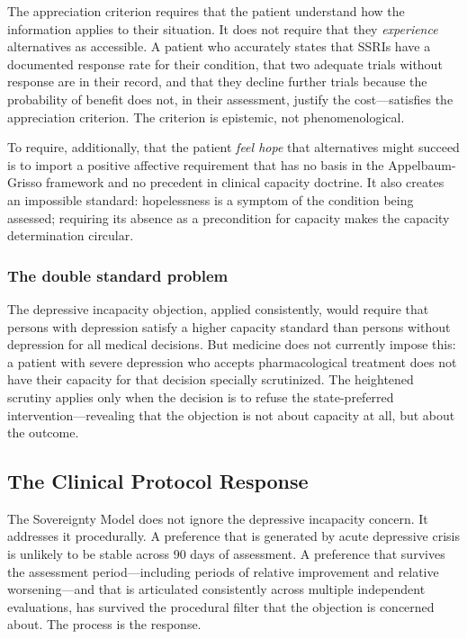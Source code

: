 \documentclass[11pt, letterpaper]{article}
\begin{document}
The appreciation criterion requires that the patient understand how the information
applies to their situation. It does not require that they \textit{experience} alternatives
as accessible. A patient who accurately states that SSRIs have a documented response
rate for their condition, that two adequate trials without response are in their record,
and that they decline further trials because the probability of benefit does not, in
their assessment, justify the cost---satisfies the appreciation criterion. The criterion
is epistemic, not phenomenological.

To require, additionally, that the patient \textit{feel hope} that alternatives might
succeed is to import a positive affective requirement that has no basis in the
Appelbaum-Grisso framework and no precedent in clinical capacity doctrine. It also
creates an impossible standard: hopelessness is a symptom of the condition being
assessed; requiring its absence as a precondition for capacity makes the capacity
determination circular.

\subsubsection{The double standard problem}

The depressive incapacity objection, applied consistently, would require that persons
with depression satisfy a higher capacity standard than persons without depression for
all medical decisions. But medicine does not currently impose this: a patient with
severe depression who accepts pharmacological treatment does not have their capacity
for that decision specially scrutinized. The heightened scrutiny applies only when the
decision is to refuse the state-preferred intervention---revealing that the objection
is not about capacity at all, but about the outcome.

\subsection{The Clinical Protocol Response}

The Sovereignty Model does not ignore the depressive incapacity concern. It addresses
it procedurally. A preference that is generated by acute depressive crisis is unlikely
to be stable across 90 days of assessment. A preference that survives the assessment
period---including periods of relative improvement and relative worsening---and
that is articulated consistently across multiple independent evaluations, has survived
the procedural filter that the objection is concerned about. The process is the
response.
\end{document}
